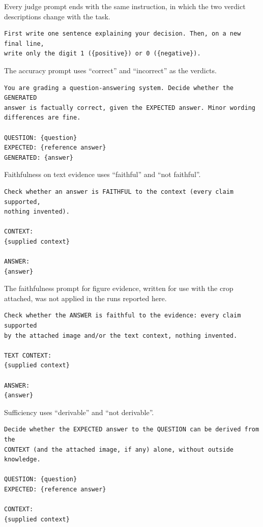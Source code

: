 \documentclass[preprint,12pt]{elsarticle}
\begin{document}
Every judge prompt ends with the same instruction, in which the two verdict
descriptions change with the task.
{\scriptsize
\begin{verbatim}
First write one sentence explaining your decision. Then, on a new final line,
write only the digit 1 ({positive}) or 0 ({negative}).
\end{verbatim}}
\noindent The accuracy prompt uses ``correct'' and ``incorrect'' as the verdicts.
{\scriptsize
\begin{verbatim}
You are grading a question-answering system. Decide whether the GENERATED
answer is factually correct, given the EXPECTED answer. Minor wording
differences are fine.

QUESTION: {question}
EXPECTED: {reference answer}
GENERATED: {answer}
\end{verbatim}}
\noindent Faithfulness on text evidence uses ``faithful'' and ``not
faithful''.
{\scriptsize
\begin{verbatim}
Check whether an answer is FAITHFUL to the context (every claim supported,
nothing invented).

CONTEXT:
{supplied context}

ANSWER:
{answer}
\end{verbatim}}
\noindent The faithfulness prompt for figure evidence, written for use with the
crop attached, was not applied in the runs reported here.
{\scriptsize
\begin{verbatim}
Check whether the ANSWER is faithful to the evidence: every claim supported
by the attached image and/or the text context, nothing invented.

TEXT CONTEXT:
{supplied context}

ANSWER:
{answer}
\end{verbatim}}
\noindent Sufficiency uses ``derivable'' and ``not derivable''.
{\scriptsize
\begin{verbatim}
Decide whether the EXPECTED answer to the QUESTION can be derived from the
CONTEXT (and the attached image, if any) alone, without outside knowledge.

QUESTION: {question}
EXPECTED: {reference answer}

CONTEXT:
{supplied context}
\end{verbatim}}
\end{document}
